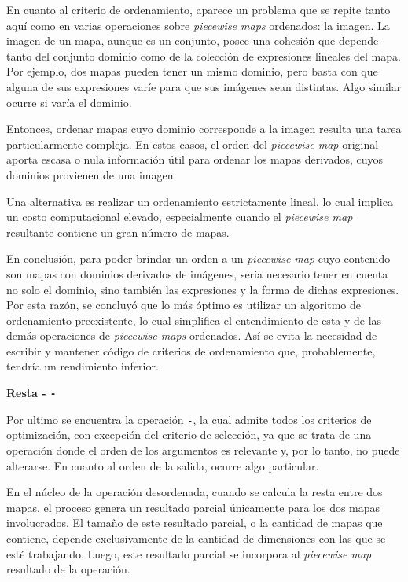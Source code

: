 En cuanto al criterio de ordenamiento, aparece un problema que se repite tanto aquí como en varias operaciones sobre \textit{piecewise maps} ordenados: la imagen. La imagen de un mapa, aunque es un conjunto, posee una cohesión que depende tanto del conjunto dominio como de la colección de expresiones lineales del mapa. Por ejemplo, dos mapas pueden tener un mismo dominio, pero basta con que alguna de sus expresiones varíe para que sus imágenes sean distintas. Algo similar ocurre si varía el dominio.

Entonces, ordenar mapas cuyo dominio corresponde a la imagen resulta una tarea particularmente compleja. En estos casos, el orden del \textit{piecewise map} original aporta escasa o nula información útil para ordenar los mapas derivados, cuyos dominios provienen de una imagen. 

Una alternativa es realizar un ordenamiento estrictamente lineal, lo cual implica un costo computacional elevado, especialmente cuando el \textit{piecewise map} resultante contiene un gran número de mapas.


En conclusión, para poder brindar un orden a un \textit{piecewise map} cuyo contenido son mapas con dominios derivados de imágenes, sería necesario tener en cuenta no solo el dominio, sino también las expresiones y la forma de dichas expresiones. Por esta razón, se concluyó que lo más óptimo es utilizar un algoritmo de ordenamiento preexistente, lo cual simplifica el entendimiento de esta y de las demás operaciones de \textit{piecewise maps} ordenados. Así se evita la necesidad de escribir y mantener código de criterios de ordenamiento que, probablemente, tendría un rendimiento inferior.


\textbf{Resta - \texttt{-}}

Por ultimo se encuentra la operación \texttt{-}, la cual admite todos los criterios de optimización, con excepción del criterio de selección, ya que se trata de una operación donde el orden de los argumentos es relevante y, por lo tanto, no puede alterarse. En cuanto al orden de la salida, ocurre algo particular. 

En el núcleo de la operación desordenada, cuando se calcula la resta entre dos mapas, el proceso genera un resultado parcial únicamente para los dos mapas involucrados. El tamaño de este resultado parcial, o la cantidad de mapas que contiene, depende exclusivamente de la cantidad de dimensiones con las que se esté trabajando. Luego, este resultado parcial se incorpora al \textit{piecewise map} resultado de la operación.


